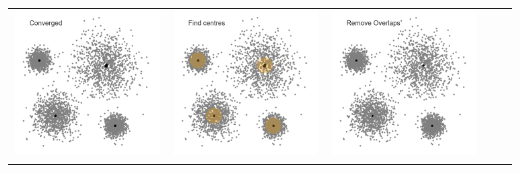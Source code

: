 \documentclass{beamer}
\begin{document}
\begin{frame}
{\begin{tabular}{ccccc}
	\includegraphics[scale=0.15]{meanshift/meanshift-36}&
	\includegraphics[scale=0.15]{meanshift/meanshift-38}&
	\includegraphics[scale=0.15]{meanshift/meanshift-40}&

\end{tabular}}
\end{frame}
\end{document}
